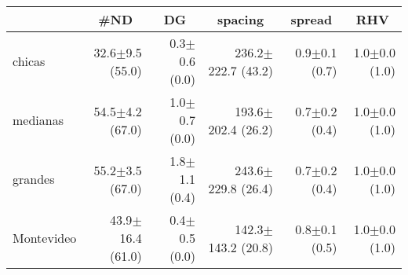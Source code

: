 \begin{adjustbox}{max width=1\textwidth}
\centering
\begin{footnotesize}
\begin{tabular}{lrrrrr}
\toprule
			&\multicolumn{1}{c}{\#ND}& \multicolumn{1}{c}{DG} & \multicolumn{1}{c}{spacing} & \multicolumn{1}{c}{spread} & \multicolumn{1}{c}{RHV} \\\midrule

 chicas     & 32.6$\pm$9.5 (55.0)  & 0.3$\pm$0.6 (0.0) & 236.2$\pm$222.7 (43.2) & 0.9$\pm$0.1 (0.7) & 1.0$\pm$0.0 (1.0) \\
 medianas   & 54.5$\pm$4.2 (67.0)  & 1.0$\pm$0.7 (0.0) & 193.6$\pm$202.4 (26.2) & 0.7$\pm$0.2 (0.4) & 1.0$\pm$0.0 (1.0) \\
 grandes    & 55.2$\pm$3.5 (67.0)  & 1.8$\pm$1.1 (0.4) & 243.6$\pm$229.8 (26.4) & 0.7$\pm$0.2 (0.4) & 1.0$\pm$0.0 (1.0) \\
 Montevideo & 43.9$\pm$16.4 (61.0) & 0.4$\pm$0.5 (0.0) & 142.3$\pm$143.2 (20.8) & 0.8$\pm$0.1 (0.5) & 1.0$\pm$0.0 (1.0) \\

\bottomrule
\end{tabular}
\end{footnotesize}
\end{adjustbox}
